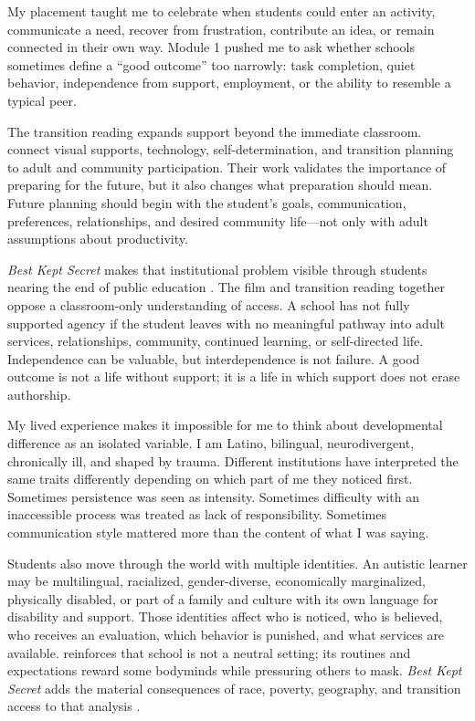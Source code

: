 
My placement taught me to celebrate when students could enter an activity, communicate a need, recover from frustration, contribute an idea, or remain connected in their own way. Module 1 pushed me to ask whether schools sometimes define a ``good outcome'' too narrowly: task completion, quiet behavior, independence from support, employment, or the ability to resemble a typical peer.

The transition reading expands support beyond the immediate classroom. \citet{stuartCollins2019transition} connect visual supports, technology, self-determination, and transition planning to adult and community participation. Their work validates the importance of preparing for the future, but it also changes what preparation should mean. Future planning should begin with the student's goals, communication, preferences, relationships, and desired community life---not only with adult assumptions about productivity.

\textit{Best Kept Secret} makes that institutional problem visible through students nearing the end of public education \citep{buck2013best}. The film and transition reading together oppose a classroom-only understanding of access. A school has not fully supported agency if the student leaves with no meaningful pathway into adult services, relationships, community, continued learning, or self-directed life. Independence can be valuable, but interdependence is not failure. A good outcome is not a life without support; it is a life in which support does not erase authorship.


My lived experience makes it impossible for me to think about developmental difference as an isolated variable. I am Latino, bilingual, neurodivergent, chronically ill, and shaped by trauma. Different institutions have interpreted the same traits differently depending on which part of me they noticed first. Sometimes persistence was seen as intensity. Sometimes difficulty with an inaccessible process was treated as lack of responsibility. Sometimes communication style mattered more than the content of what I was saying.

Students also move through the world with multiple identities. An autistic learner may be multilingual, racialized, gender-diverse, economically marginalized, physically disabled, or part of a family and culture with its own language for disability and support. Those identities affect who is noticed, who is believed, who receives an evaluation, which behavior is punished, and what services are available. \citet{harvey2018school} reinforces that school is not a neutral setting; its routines and expectations reward some bodyminds while pressuring others to mask. \textit{Best Kept Secret} adds the material consequences of race, poverty, geography, and transition access to that analysis \citep{buck2013best}.

